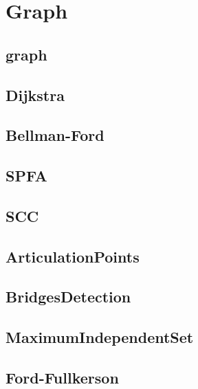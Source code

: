 \section{Graph}

\subsection{graph}


\subsection{Dijkstra}


\subsection{Bellman-Ford}


\subsection{SPFA}


\subsection{SCC}


\subsection{ArticulationPoints}


\subsection{BridgesDetection}


\subsection{MaximumIndependentSet}


\subsection{Ford-Fullkerson}


